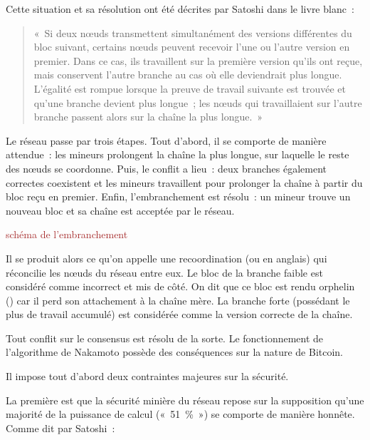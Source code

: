 Cette situation et sa résolution ont été décrites par Satoshi dans le livre blanc~:

\begin{quote}
«~Si deux nœuds transmettent simultanément des versions différentes du bloc suivant, certains nœuds peuvent recevoir l'une ou l'autre version en premier. Dans ce cas, ils travaillent sur la première version qu'ils ont reçue, mais conservent l'autre branche au cas où elle deviendrait plus longue. L'égalité est rompue lorsque la preuve de travail suivante est trouvée et qu'une branche devient plus longue~; les nœuds qui travaillaient sur l'autre branche passent alors sur la chaîne la plus longue.~»
\end{quote}

Le réseau passe par trois étapes. Tout d'abord, il se comporte de manière attendue~: les mineurs prolongent la chaîne la plus longue, sur laquelle le reste des nœuds se coordonne. Puis, le conflit a lieu~: deux branches également correctes coexistent et les mineurs travaillent pour prolonger la chaîne à partir du bloc reçu en premier. Enfin, l'embranchement est résolu~: un mineur trouve un nouveau bloc et sa chaîne est acceptée par le réseau.

\textcolor{brown}{schéma de l'embranchement} 

Il se produit alors ce qu'on appelle une recoordination (ou  en anglais) qui réconcilie les nœuds du réseau entre eux. Le bloc de la branche faible est considéré comme incorrect et mis de côté. On dit que ce bloc est rendu orphelin () car il perd son attachement à la chaîne mère. La branche forte (possédant le plus de travail accumulé) est considérée comme la version correcte de la chaîne.

Tout conflit sur le consensus est résolu de la sorte. Le fonctionnement de l'algorithme de Nakamoto possède des conséquences sur la nature de Bitcoin.


Il impose tout d'abord deux contraintes majeures sur la sécurité.

La première est que la sécurité minière du réseau repose sur la supposition qu'une majorité de la puissance de calcul («~51~\%~») se comporte de manière honnête. Comme dit par Satoshi~:

